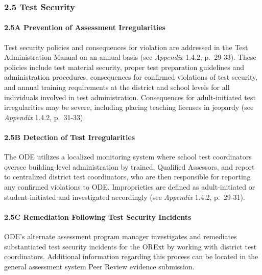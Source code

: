 \documentclass[]{article}
\let\oldparagraph\paragraph
\renewcommand{\paragraph}[1]{\oldparagraph{#1}\mbox{}}
\begin{document}
\subsubsection{2.5 Test Security}\label{test-security}

\paragraph{2.5A Prevention of Assessment
Irregularities}\label{a-prevention-of-assessment-irregularities}

Test security policies and consequences for violation are addressed in
the Test Administration Manual on an annual basis (see \emph{Appendix}
1.4.2, p.~29-33). These policies include test material security, proper
test preparation guidelines and administration procedures, consequences
for confirmed violations of test security, and annual training
requirements at the district and school levels for all individuals
involved in test administration. Consequences for adult-initiated test
irregularities may be severe, including placing teaching licenses in
jeopardy (see \emph{Appendix} 1.4.2, p.~31-33).

\paragraph{2.5B Detection of Test
Irregularities}\label{b-detection-of-test-irregularities}

The ODE utilizes a localized monitoring system where school test
coordinators oversee building-level administration by trained, Qualified
Assessors, and report to centralized district test coordinators, who are
then responsible for reporting any confirmed violations to ODE.
Improprieties are defined as adult-initiated or student-initiated and
investigated accordingly (see \emph{Appendix} 1.4.2, p.~29-31).

\paragraph{2.5C Remediation Following Test Security
Incidents}\label{c-remediation-following-test-security-incidents}

ODE's alternate assessment program manager investigates and remediates
substantiated test security incidents for the ORExt by working with
district test coordinators. Additional information regarding this
process can be located in the general assessment system Peer Review
evidence submission.
\end{document}
